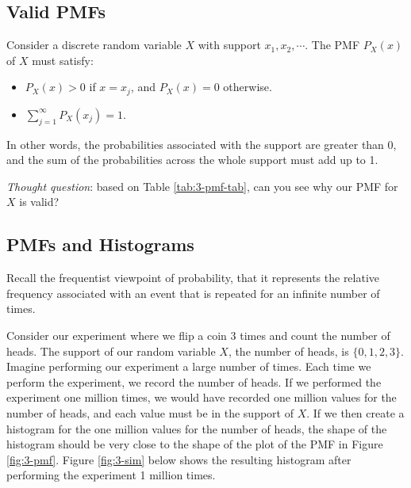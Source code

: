 \documentclass[
]{book}
\providecommand{\tightlist}{%
  \setlength{\itemsep}{0pt}\setlength{\parskip}{0pt}}
\begin{document}
\subsection{Valid PMFs}\label{valid-pmfs}

Consider a discrete random variable \(X\) with support \(x_1, x_2, \cdots\). The PMF \(P_X(x)\) of \(X\) must satisfy:

\begin{itemize}
\tightlist
\item
  \(P_X(x) > 0\) if \(x = x_j\), and \(P_X(x) = 0\) otherwise.
\item
  \(\sum_{j=1}^{\infty} P_X(x_j) = 1\).
\end{itemize}

In other words, the probabilities associated with the support are greater than 0, and the sum of the probabilities across the whole support must add up to 1.

\emph{Thought question}: based on Table \ref{tab:3-pmf-tab}, can you see why our PMF for \(X\) is valid?

\subsection{PMFs and Histograms}\label{pmfhist}

Recall the frequentist viewpoint of probability, that it represents the relative frequency associated with an event that is repeated for an infinite number of times.

Consider our experiment where we flip a coin 3 times and count the number of heads. The support of our random variable \(X\), the number of heads, is \(\{0,1,2,3 \}\). Imagine performing our experiment a large number of times. Each time we perform the experiment, we record the number of heads. If we performed the experiment one million times, we would have recorded one million values for the number of heads, and each value must be in the support of \(X\). If we then create a histogram for the one million values for the number of heads, the shape of the histogram should be very close to the shape of the plot of the PMF in Figure \ref{fig:3-pmf}. Figure \ref{fig:3-sim} below shows the resulting histogram after performing the experiment 1 million times.
\end{document}
